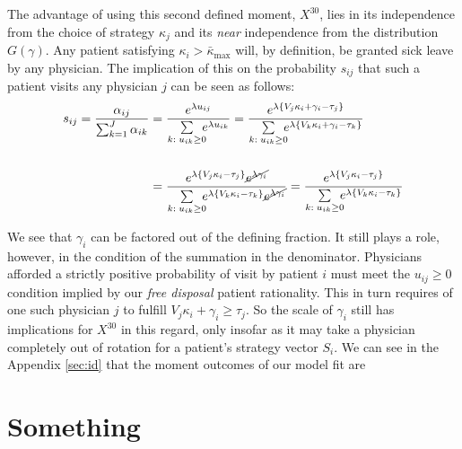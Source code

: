 \documentclass[../main.tex]{subfiles}
\begin{document}
The advantage of using this second defined moment, $X^{30}$, lies in its independence from the choice of strategy $\kappa_j$ and its \textit{near} independence from the distribution $G(\gamma)$. Any patient satisfying $\kappa_i > \bar{\kappa}_{\max}$ will, by definition, be granted sick leave by any physician. The implication of this on the probability $s_{ij}$ that such a patient visits any physician $j$ can be seen as follows:
\begin{align*}
    s_{ij} = \frac{\alpha_{ij}}{\sum_{k = 1}^{J} \alpha_{ik}} & =
    \frac{e^{\lambda u_{ij}}}{\sum\limits_{k : \; u_{ik} \geq 0} \hspace{-0.5em} e^{\lambda u_{ik}}} 
    =
    \frac{e^{\lambda \{V_j \kappa_i + \gamma_i - \tau_j \}}}{\sum\limits_{k : \; u_{ik} \geq 0} \hspace{-0.5em} e^{\lambda \{V_k \kappa_i + \gamma_i - \tau_k \}}} \\
    \\ 
   & = \frac{e^{\lambda \{V_j \kappa_i - \tau_j \}} \cancel{e^{\lambda \gamma_i}}}{\sum\limits_{k : \; u_{ik} \geq 0} \hspace{-0.5em} e^{\lambda \{V_k \kappa_i  - \tau_k \}} \cancel{e^{\lambda\gamma_i}}} =
    \frac{e^{\lambda \{V_j \kappa_i - \tau_j \}}}{\sum\limits_{k : \; u_{ik} \geq 0} \hspace{-0.5em} e^{\lambda \{V_k \kappa_i - \tau_k \}}}
\end{align*}

We see that $\gamma_i$ can be factored out of the defining fraction. It still plays a role, however, in the condition of the summation in the denominator. Physicians afforded a strictly positive probability of visit by patient $i$ must meet the $u_{ij} \geq 0$ condition implied by our \textit{free disposal} patient rationality. This in turn requires of one such physician $j$ to fulfill $V_j \kappa_i + \gamma_i \geq \tau_j$. So the scale of $\gamma_i$ still has implications for $X^{30}$ in this regard, only insofar as it may take a physician completely out of rotation for a patient's strategy vector $S_i$. We can see in the Appendix \ref{sec:id} that the moment outcomes of our model fit are 




\newpage

\section{Something}

\vspace{-0.1em}
\end{document}
